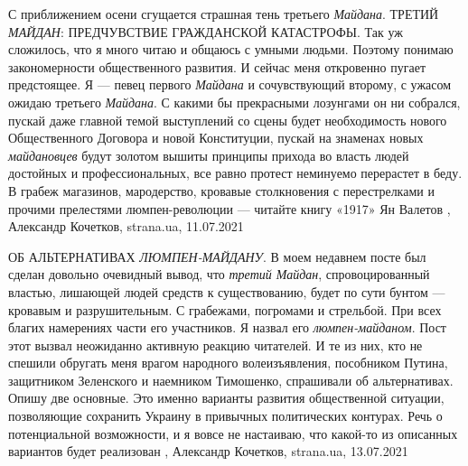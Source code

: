 С приближением осени сгущается страшная тень третьего \emph{Майдана}. ТРЕТИЙ \emph{МАЙДАН}:
ПРЕДЧУВСТВИЕ ГРАЖДАНСКОЙ КАТАСТРОФЫ.  Так уж сложилось, что я много читаю и
общаюсь с умными людьми. Поэтому понимаю закономерности общественного развития.
И сейчас меня откровенно пугает предстоящее. Я — певец первого \emph{Майдана} и
сочувствующий второму, с ужасом ожидаю третьего \emph{Майдана}.  С какими бы
прекрасными лозунгами он ни собрался, пускай даже главной темой выступлений со
сцены будет необходимость нового Общественного Договора и новой Конституции,
пускай на знаменах новых \emph{майдановцев} будут золотом вышиты принципы прихода во
власть людей достойных и профессиональных, все равно протест неминуемо
перерастет в беду. В грабеж магазинов, мародерство, кровавые столкновения с
перестрелками и прочими прелестями люмпен-революции — читайте книгу «1917» Ян
Валетов
, 
Александр Кочетков, strana.ua, 11.07.2021

ОБ АЛЬТЕРНАТИВАХ \emph{ЛЮМПЕН-МАЙДАНУ}.
В моем недавнем посте был сделан довольно очевидный вывод, что \emph{третий Майдан},
спровоцированный властью, лишающей людей средств к существованию, будет по сути
бунтом — кровавым и разрушительным. С грабежами, погромами и стрельбой. При
всех благих намерениях части его участников. Я назвал его \emph{люмпен-майданом}.
Пост этот вызвал неожиданно активную реакцию читателей. И те из них, кто не
спешили обругать меня врагом народного волеизъявления, пособником Путина,
защитником Зеленского и наемником Тимошенко, спрашивали об альтернативах.
Опишу две основные. Это именно варианты развития общественной ситуации,
позволяющие сохранить Украину в привычных политических контурах. Речь о
потенциальной возможности, и я вовсе не настаиваю, что какой-то из описанных
вариантов будет реализован
, 
Александр Кочетков, strana.ua, 13.07.2021

